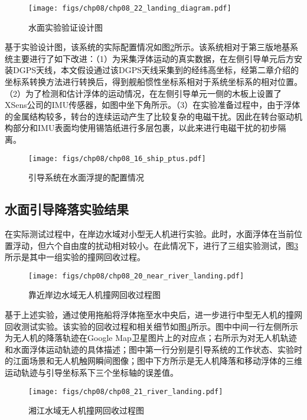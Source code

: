 \begin{figure}[!th]
	\centering
	\texttt{[image: figs/chp08/chp08\_22\_landing\_diagram.pdf]}	
	\caption{水面实验验证设计图}
	\label{fig:chp08_22_landing_diagram}
\end{figure}

基于实验设计图，该系统的实际配置情况如图\ref{fig:chp08_16_ship_ptus}所示。该系统相对于第三版地基系统主要进行了如下改进：（1）为采集浮体运动的真实数据，在左侧引导单元后方安装DGPS天线，本文假设通过该DGPS天线采集到的经纬高坐标，经第二章介绍的坐标系转换方法进行转换后，得到舰船惯性坐标系相对于系统坐标系的相对位置。（2）为了检测和估计浮体的运动情况，在左侧引导单元一侧的木板上设置了XSens公司的IMU传感器，如图中坐下角所示。（3）在实验准备过程中，由于浮体的金属结构较多，转台的连续运动产生了比较复杂的电磁干扰。因此在转台驱动机构部分和IMU表面均使用锡箔纸进行多层包裹，以此来进行电磁干扰的初步隔离。

\begin{figure}[!ht]
	\centering
	\texttt{[image: figs/chp08/chp08\_16\_ship\_ptus.pdf]}	
	\caption{引导系统在水面浮提的配置情况}
	\label{fig:chp08_16_ship_ptus}
\end{figure}


\subsection{水面引导降落实验结果}
在实际测试过程中，在岸边水域对小型无人机进行实验。此时，水面浮体在当前位置浮动，但六个自由度的扰动相对较小。在此情况下，进行了三组实验测试，图\ref{fig:chp08_20_near_river_landing}所示是其中一组实验的撞网回收过程。

\begin{figure}[!th]
	\centering
	\texttt{[image: figs/chp08/chp08\_20\_near\_river\_landing.pdf]}	
	\caption{靠近岸边水域无人机撞网回收过程图}
	\label{fig:chp08_20_near_river_landing}
\end{figure}

基于上述实验，通过使用拖船将浮体拖至水中央后，进一步进行中型无人机的撞网回收测试实验。该实验的回收过程和相关细节如图\ref{fig:chp08_21_river_landing}所示。图中中间一行左侧所示为无人机的降落轨迹在Google Map卫星图片上的对应点；右所示为对无人机轨迹和水面浮体运动轨迹的具体描述；图中第一行分别是引导系统的工作状态、实验时的江面场景和无人机触网瞬间图像；图中下方所示是无人机降落和移动浮体的三维运动轨迹与引导坐标系下三个坐标轴的误差值。

\begin{figure}[!t]
	\centering
	\texttt{[image: figs/chp08/chp08\_21\_river\_landing.pdf]}	
	\caption{湘江水域无人机撞网回收过程图}
	\label{fig:chp08_21_river_landing}
\end{figure}

